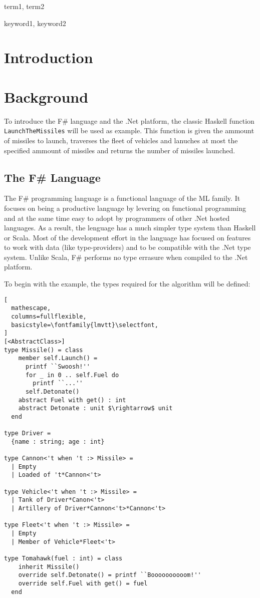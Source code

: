\documentclass{sigplanconf}
\begin{document}
\terms
term1, term2

\keywords
keyword1, keyword2

\section{Introduction}

\section{Background}
To introduce the F\# language and the .Net platform, the classic Haskell function \verb+LaunchTheMissiles+ will be used as example. This function is given the ammount of missiles to launch, traverses the fleet of vehicles and lanuches at most the specified ammount of missiles and returns the number of missiles launched.
\subsection{The F\# Language}
The F\# programming language is a functional language of the ML family. It focuses on being a productive language by levering on functional programming and at the same time easy to adopt by programmers of other .Net hosted languages. As a result, the lenguage has a much simpler type system than Haskell or Scala. Most of the development effort in the language has focused on features to work with data (like type-providers) and to be compatible with the .Net type system. Unlike Scala, F\# performs no type errasure when compiled to the .Net platform.

To begin with the example, the types required for the algorithm will be defined:
\begin{lstlisting}[
  mathescape,
  columns=fullflexible,
  basicstyle=\fontfamily{lmvtt}\selectfont,
]
[<AbstractClass>]
type Missile() = class
    member self.Launch() = 
      printf ``Swoosh!''
      for _ in 0 .. self.Fuel do
        printf ``...''
      self.Detonate()
    abstract Fuel with get() : int
    abstract Detonate : unit $\rightarrow$ unit
  end

type Driver = 
  {name : string; age : int}

type Cannon<'t when 't :> Missile> =
  | Empty
  | Loaded of 't*Cannon<'t>

type Vehicle<'t when 't :> Missile> =
  | Tank of Driver*Canon<'t>
  | Artillery of Driver*Cannon<'t>*Cannon<'t>

type Fleet<'t when 't :> Missile> =
  | Empty
  | Member of Vehicle*Fleet<'t>

type Tomahawk(fuel : int) = class
    inherit Missile()
    override self.Detonate() = printf ``Boooooooooom!''
    override self.Fuel with get() = fuel
  end
\end{lstlisting}
\end{document}
